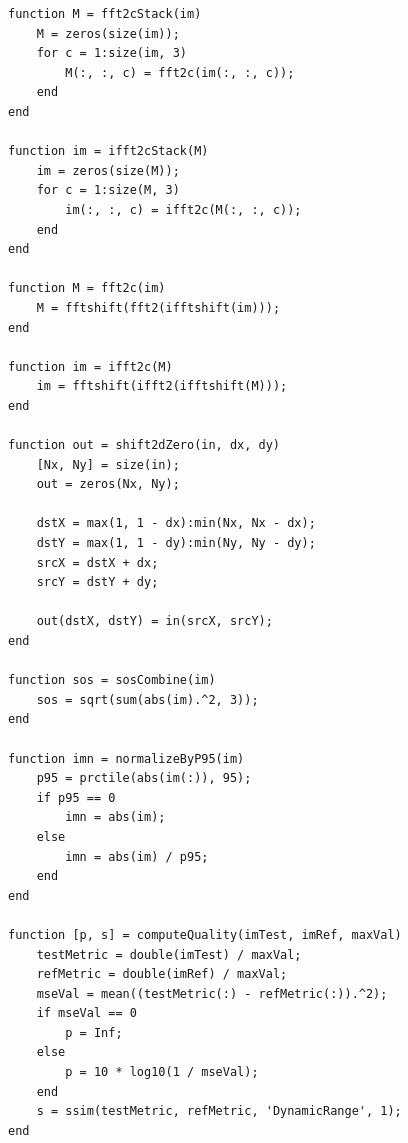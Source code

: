 \documentclass[11pt]{article}
\begin{document}
\begin{lstlisting}
function M = fft2cStack(im)
    M = zeros(size(im));
    for c = 1:size(im, 3)
        M(:, :, c) = fft2c(im(:, :, c));
    end
end

function im = ifft2cStack(M)
    im = zeros(size(M));
    for c = 1:size(M, 3)
        im(:, :, c) = ifft2c(M(:, :, c));
    end
end

function M = fft2c(im)
    M = fftshift(fft2(ifftshift(im)));
end

function im = ifft2c(M)
    im = fftshift(ifft2(ifftshift(M)));
end

function out = shift2dZero(in, dx, dy)
    [Nx, Ny] = size(in);
    out = zeros(Nx, Ny);

    dstX = max(1, 1 - dx):min(Nx, Nx - dx);
    dstY = max(1, 1 - dy):min(Ny, Ny - dy);
    srcX = dstX + dx;
    srcY = dstY + dy;

    out(dstX, dstY) = in(srcX, srcY);
end

function sos = sosCombine(im)
    sos = sqrt(sum(abs(im).^2, 3));
end

function imn = normalizeByP95(im)
    p95 = prctile(abs(im(:)), 95);
    if p95 == 0
        imn = abs(im);
    else
        imn = abs(im) / p95;
    end
end

function [p, s] = computeQuality(imTest, imRef, maxVal)
    testMetric = double(imTest) / maxVal;
    refMetric = double(imRef) / maxVal;
    mseVal = mean((testMetric(:) - refMetric(:)).^2);
    if mseVal == 0
        p = Inf;
    else
        p = 10 * log10(1 / mseVal);
    end
    s = ssim(testMetric, refMetric, 'DynamicRange', 1);
end
\end{lstlisting}
\end{document}
